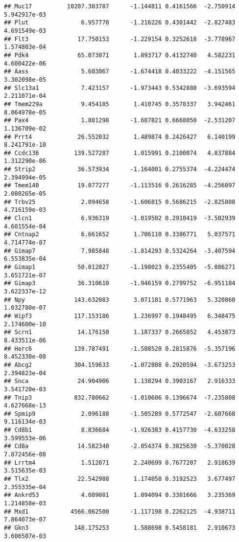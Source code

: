 \documentclass[
]{article}
\begin{document}
\begin{verbatim}
## Muc17          10207.303787      -1.144811 0.4161566  -2.750914 5.942917e-03
## Plut               6.957770      -1.216226 0.4301442  -2.827483 4.691549e-03
## Flt3              17.750153      -1.229154 0.3252618  -3.778967 1.574803e-04
## Pdk4              65.073071       1.893717 0.4132740   4.582231 4.600422e-06
## Aass               5.603067      -1.674418 0.4033222  -4.151565 3.302098e-05
## Slc13a1            7.423157      -1.973443 0.5342880  -3.693594 2.211071e-04
## Tmem229a           9.454185       1.410745 0.3578337   3.942461 8.064978e-05
## Pax4               1.801298      -1.687821 0.6668050  -2.531207 1.136709e-02
## Prrt4             26.552032       1.489874 0.2426427   6.140199 8.241791e-10
## Ccdc136          139.527287       1.015991 0.2100074   4.837884 1.312290e-06
## Strip2            36.573934      -1.164001 0.2755374  -4.224474 2.394994e-05
## Tmem140           19.077277      -1.113516 0.2616285  -4.256097 2.080265e-05
## Trbv25             2.094658      -1.606815 0.5686215  -2.825808 4.716159e-03
## Clcn1              6.936319      -1.019502 0.2910419  -3.502939 4.601554e-04
## Cntnap2            6.661652       1.706110 0.3386771   5.037571 4.714774e-07
## Gimap7             7.985848      -1.814293 0.5324264  -3.407594 6.553835e-04
## Gimap1            50.012027      -1.198023 0.2355405  -5.086271 3.651721e-07
## Gimap3            36.310610      -1.946159 0.2799752  -6.951184 3.622337e-12
## Npy              143.632083       3.071181 0.5771963   5.320860 1.032780e-07
## Wipf3            117.153186       1.236997 0.1948495   6.348475 2.174600e-10
## Scrn1             14.176150       1.187337 0.2665852   4.453873 8.433511e-06
## Herc6            139.787491      -1.508520 0.2815876  -5.357196 8.452330e-08
## Abcg2            304.159633      -1.072808 0.2920594  -3.673253 2.394823e-04
## Snca              24.904906       1.138294 0.3903167   2.916333 3.541720e-03
## Tnip3            832.780662      -1.010606 0.1396674  -7.235808 4.627668e-13
## Spmip9             2.096188      -1.505289 0.5772547  -2.607668 9.116134e-03
## Cd8b1              8.836684      -1.926383 0.4157730  -4.633258 3.599553e-06
## Cd8a              14.582340      -2.054374 0.3825630  -5.370028 7.872456e-08
## Lrrtm4             1.512071       2.240699 0.7677207   2.918639 3.515635e-03
## Tlx2              22.542988       1.174050 0.3192523   3.677497 2.355335e-04
## Ankrd53            4.089081       1.094094 0.3381666   3.235369 1.214858e-03
## Mxd1            4566.062500      -1.117198 0.2262125  -4.938711 7.864073e-07
## Gkn3             148.175253       1.588698 0.5458181   2.910673 3.606507e-03

\end{verbatim}
\end{document}
